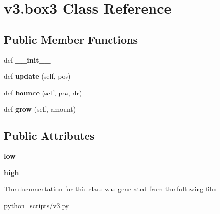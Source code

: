 \hypertarget{classv3_1_1box3}{}\section{v3.\+box3 Class Reference}
\label{classv3_1_1box3}
\subsection*{Public Member Functions}
\begin{DoxyCompactItemize}
\item 
\hypertarget{classv3_1_1box3_ae0e11ebcc68853135cec1a43454f9ef1}{}def {\bfseries \+\_\+\+\_\+init\+\_\+\+\_\+}\label{classv3_1_1box3_ae0e11ebcc68853135cec1a43454f9ef1}

\item 
\hypertarget{classv3_1_1box3_a42acf62d0f06b489743510649aa63ced}{}def {\bfseries update} (self, pos)\label{classv3_1_1box3_a42acf62d0f06b489743510649aa63ced}

\item 
\hypertarget{classv3_1_1box3_ac6a0cad2aa288c495e5b4339042feb94}{}def {\bfseries bounce} (self, pos, dr)\label{classv3_1_1box3_ac6a0cad2aa288c495e5b4339042feb94}

\item 
\hypertarget{classv3_1_1box3_a62969f1b236a1c75d54f85167b638bc8}{}def {\bfseries grow} (self, amount)\label{classv3_1_1box3_a62969f1b236a1c75d54f85167b638bc8}

\end{DoxyCompactItemize}
\subsection*{Public Attributes}
\begin{DoxyCompactItemize}
\item 
\hypertarget{classv3_1_1box3_a3da80dabc2342f95060a71a67cae5b3c}{}{\bfseries low}\label{classv3_1_1box3_a3da80dabc2342f95060a71a67cae5b3c}

\item 
\hypertarget{classv3_1_1box3_abad1e1f596392a30606ad8d56e9bd4ee}{}{\bfseries high}\label{classv3_1_1box3_abad1e1f596392a30606ad8d56e9bd4ee}

\end{DoxyCompactItemize}


The documentation for this class was generated from the following file\+:\begin{DoxyCompactItemize}
\item 
python\+\_\+scripts/v3.\+py\end{DoxyCompactItemize}
